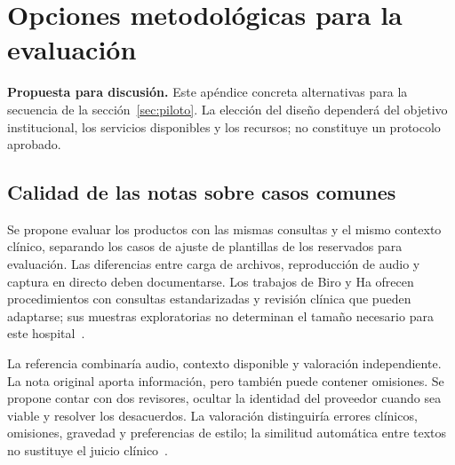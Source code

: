 \clearpage
\section{Opciones metodológicas para la evaluación}
\label{app:evaluacion-piloto}
\textbf{Propuesta para discusión.} Este apéndice concreta alternativas para la secuencia de la sección~\ref{sec:piloto}. La elección del diseño dependerá del objetivo institucional, los servicios disponibles y los recursos; no constituye un protocolo aprobado.

\subsection{Calidad de las notas sobre casos comunes}
Se propone evaluar los productos con las mismas consultas y el mismo contexto clínico, separando los casos de ajuste de plantillas de los reservados para evaluación. Las diferencias entre carga de archivos, reproducción de audio y captura en directo deben documentarse. Los trabajos de Biro y Ha ofrecen procedimientos con consultas estandarizadas y revisión clínica que pueden adaptarse; sus muestras exploratorias no determinan el tamaño necesario para este hospital~\cite{NNWFT2JX,PRTISMYF}.

La referencia combinaría audio, contexto disponible y valoración independiente. La nota original aporta información, pero también puede contener omisiones. Se propone contar con dos revisores, ocultar la identidad del proveedor cuando sea viable y resolver los desacuerdos. La valoración distinguiría errores clínicos, omisiones, gravedad y preferencias de estilo; la similitud automática entre textos no sustituye el juicio clínico~\cite{NNWFT2JX,4IHZ7QFQ}.

